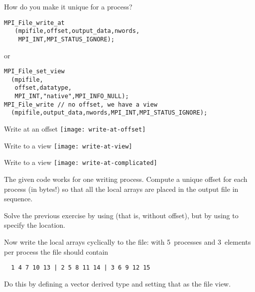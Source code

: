 \begin{frame}[containsverbatim]{How do you make it unique for a process?}
\lstset{language=C}
\begin{lstlisting}
MPI_File_write_at
   (mpifile,offset,output_data,nwords,
    MPI_INT,MPI_STATUS_IGNORE);
\end{lstlisting}
or
\begin{lstlisting}
MPI_File_set_view
  (mpifile,
   offset,datatype,
   MPI_INT,"native",MPI_INFO_NULL);
MPI_File_write // no offset, we have a view
  (mpifile,output_data,nwords,MPI_INT,MPI_STATUS_IGNORE);
\end{lstlisting}
\end{frame}

\begin{frame}{Write at an offset}
  \texttt{[image: write-at-offset]}
\end{frame}

\begin{frame}{Write to a view}
  \texttt{[image: write-at-view]}
\end{frame}

\begin{frame}{Write to a view}
  \texttt{[image: write-at-complicated]}
\end{frame}

\begin{exerciseframe}[blockwrite]
  The given code works for one writing process. Compute a unique
  offset for each process (in bytes!) so that all the local arrays are
  placed in the output file in sequence.
\end{exerciseframe}

\begin{exerciseframe}[viewwrite]
  Solve the previous exercise by using  (that is,
  without offset), but by using  to specify the location.
\end{exerciseframe}

\begin{exerciseframe}[scatterwrite]
  Now write the local arrays cyclically to the file: with 5~processes
  and 3~elements per process the file should contain
\begin{verbatim}
  1 4 7 10 13 | 2 5 8 11 14 | 3 6 9 12 15
\end{verbatim}
  Do this by defining a vector derived type and setting that as the
  file view.
\end{exerciseframe}

\endinput

\begin{frame}[containsverbatim]\frametitle{}
\begin{verbatim}

\end{verbatim}
\end{frame}

